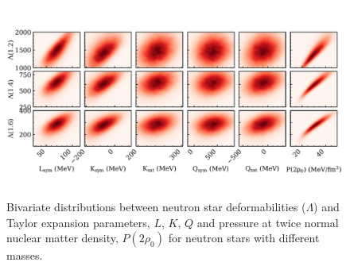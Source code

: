 \documentclass[%
10pt]{article}
\begin{document}
\begin{figure}[htb!]
\centering
\includegraphics[width=1.0\linewidth]{figures/lamda_LKQ.pdf}
\caption{
Bivariate distributions between neutron star deformabilities ($\Lambda$) and Taylor expansion parameters, $L$, $K$, $Q$ and pressure at twice normal nuclear matter density, $P(2\rho_0)$ for neutron stars with different masses.
}
\end{figure}
\end{document}
